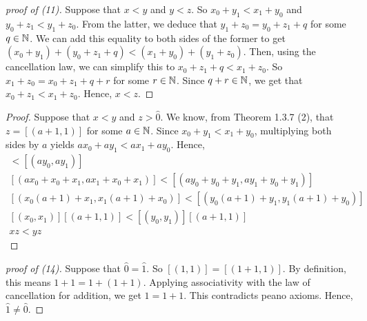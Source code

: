 \begin{proof}[proof of (11)]
    Suppose that \(x < y\) and \(y < z\). So \(x_0 + y_1 < x_1 + y_0\) and \(y_0 + z_1 < y_1 + z_0\). From the latter, we deduce that \(y_1 + z_0 = y_0 + z_1 + q\) for some \(q \in \mathbb{N}\).
    We can add this equality to both sides of the former to get \((x_0 + y_1) + (y_0 + z_1 + q) < (x_1 + y_0) + (y_1 + z_0)\). Then, using the cancellation law, we can simplify this to
    \(x_0 + z_1 + q < x_1 + z_0\). So \(x_1 + z_0 = x_0 + z_1 + q + r\) for some \(r \in \mathbb{N}\). Since \(q+r \in \mathbb{N}\), we get that \(x_0 + z_1 < x_1 + z_0\). Hence, \(x < z\).
\end{proof}
\begin{proof}
    Suppose that \(x < y\) and \(z > \hat{0}\). We know, from Theorem 1.3.7 (2), that \(z = [(a+1, 1)]\) for some \(a \in \mathbb{N}\).
    Since \(x_0 + y_1 < x_1 + y_0\), multiplying both sides by \(a\) yields \(ax_0 + ay_1 < ax_1 + ay_0\).
    Hence,
    \begin{gather*}
        [(ax_0, ax_1)] < [(ay_0, ay_1)] \\
        [(ax_0 + x_0 + x_1, ax_1 + x_0 + x_1)] < [(ay_0 + y_0 + y_1, ay_1 + y_0 + y_1)]\\
        [(x_0(a+1)+x_1, x_1(a+1) + x_0)] < [(y_0(a+1) + y_1, y_1(a+1) + y_0)] \\
        [(x_0, x_1)][(a+1, 1)] < [(y_0, y_1)][(a+1, 1)]\\
        xz < yz
    \end{gather*}
\end{proof}
\begin{proof}[proof of (14)]
    Suppose that \(\hat{0} = \hat{1}\). So \([(1,1)] = [(1+1, 1)]\). By definition, this means \(1 + 1 = 1 + (1+1)\). Applying associativity with the law of cancellation for addition, we get \(1 = 1+ 1\). This contradicts peano axioms. Hence, \(\hat{1} \neq \hat{0}\).
\end{proof}
